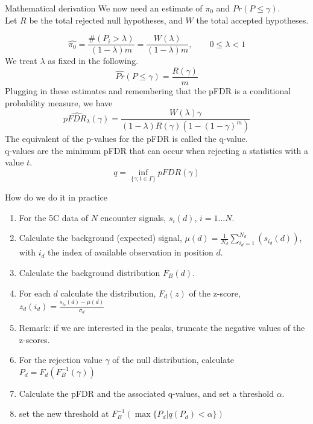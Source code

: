 \documentclass[8pt]{beamer}
\begin{document}
\begin{frame}{Mathematical derivation}
We now need an estimate of $\pi_0$ and $Pr(P\leq\gamma)$.\\ 
Let $R$ be the total rejected null hypotheses, and $W$ the total accepted hypotheses. 

\begin{equation*}
\hat{\pi_0}=\frac{\#(P_i>\lambda)}{(1-\lambda)m}=\frac{W(\lambda)}{(1-\lambda)m}, \qquad 0\leq\lambda< 1
\end{equation*}
We treat $\lambda$ as fixed in the following. 
\begin{equation*}
\hat{Pr}(P\leq\gamma)=\frac{R(\gamma)}{m}
\end{equation*}
Plugging in these estimates and remembering that the pFDR is a conditional probability measure, we have 
\begin{equation*}
p\hat{FDR}_\lambda (\gamma)=\frac{W(\lambda)\gamma}{(1-\lambda)R(\gamma)(1-(1-\gamma)^m)}
\end{equation*}
The equivalent of the p-values for the pFDR is called the q-value.\\
q-values are the minimum pFDR that can occur when rejecting a statistics with a value $t$. 
\begin{equation*}
q = \inf_{\{\gamma; t\in\Gamma\}}pFDR(\gamma)
\end{equation*}
\end{frame}

\begin{frame}{How do we do it in practice}

\begin{enumerate}
\item For the 5C data of $N$ encounter signals, $s_i(d)$, $i=1...N$. 
\item Calculate the background (expected) signal, $\mu(d)=\frac{1}{N_d}\sum_{i_d=1}^{N_d}(s_{i_d}(d))$, with $i_d$ the index of available observation in position $d$.
\item Calculate the background distribution $F_B(d)$. 
\item For each $d$ calculate the distribution, $F_d(z)$ of the z-score, $z_d(i_d)=\frac{s_{i_d}(d)-\mu(d)}{\sigma_d}$
\item Remark: if we are interested in the peaks, truncate the negative values of the z-scores.
\item For the rejection value $\gamma$ of the null distribution, calculate $P_d = F_d(F_B^{-1}(\gamma))$
\item Calculate the pFDR and the associated q-values, and set a threshold $\alpha$.
\item set the new threshold at $F_B^{-1}(\max\{P_d| q(P_d)<\alpha\})$
\end{enumerate}
\end{frame}
\end{document}
